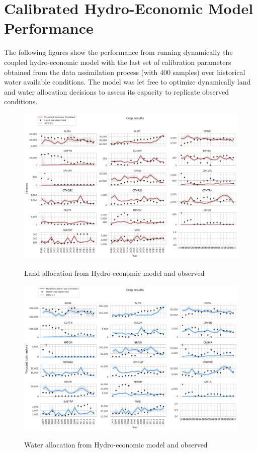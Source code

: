 \documentclass[11pt,a4paper]{article}
\begin{document}
\section{Calibrated Hydro-Economic Model Performance}

The following figures show the performance from running dynamically the coupled hydro-economic model with the last set of calibration parameters obtained from the data assimilation process (with 400 samples) over historical water available conditions. The model was let free to optimize dynamically land and water allocation decisions to assess its capacity to replicate observed conditions. 

\begin{figure}[H]
\centering
\includegraphics[width=1\textwidth]{./figs/land_use.png}
\label{fig:mesh1}
\caption{Land allocation from Hydro-economic model and observed}
\end{figure}

\begin{figure}[H]
\centering
\includegraphics[width=1\textwidth]{./figs/water_use.png}
\label{fig:mesh1}
\caption{Water allocation from Hydro-economic model and observed}
\end{figure}
\end{document}
